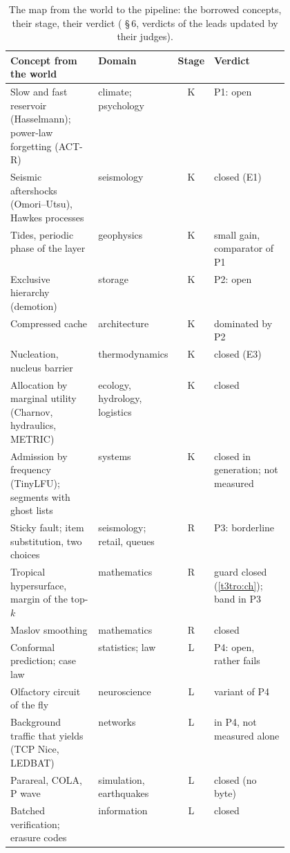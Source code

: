\begin{table}[tbp]
\centering\footnotesize
\caption[The map from the world to the pipeline]{The map from the world to the pipeline: the borrowed concepts, their stage, their verdict ( §\,6, verdicts of the leads updated by their judges).}
\label{t3mim:tab:carte}
\renewcommand{\arraystretch}{1.08}
\begin{tabularx}{\linewidth}{@{}>{\raggedright\arraybackslash}X>{\raggedright\arraybackslash}p{0.2\linewidth}c>{\raggedright\arraybackslash}p{0.27\linewidth}@{}}
\toprule
Concept from the world & Domain & Stage & Verdict \\
\midrule
Slow and fast reservoir (Hasselmann); power-law forgetting (ACT-R) & climate; psychology & K & P1: open \\
Seismic aftershocks (Omori--Utsu), Hawkes processes & seismology & K & closed (E1) \\
Tides, periodic phase of the layer & geophysics & K & small gain, comparator of P1 \\
Exclusive hierarchy (demotion) & storage & K & P2: open \\
Compressed cache & architecture & K & dominated by P2 \\
Nucleation, nucleus barrier & thermodynamics & K & closed (E3) \\
Allocation by marginal utility (Charnov, hydraulics, METRIC) & ecology, hydrology, logistics & K & closed \\
Admission by frequency (TinyLFU); segments with ghost lists & systems & K & closed in generation; not measured \\
Sticky fault; item substitution, two choices & seismology; retail, queues & R & P3: borderline \\
Tropical hypersurface, margin of the top-$k$ & mathematics & R & guard closed (\cref{t3tro:ch}); band in P3 \\
Maslov smoothing & mathematics & R & closed \\
Conformal prediction; case law & statistics; law & L & P4: open, rather fails \\
Olfactory circuit of the fly & neuroscience & L & variant of P4 \\
Background traffic that yields (TCP Nice, LEDBAT) & networks & L & in P4, not measured alone \\
Parareal, COLA, P wave & simulation, earthquakes & L & closed (no byte) \\
Batched verification; erasure codes & information & L & closed \\

\end{tabularx}
\end{table}
